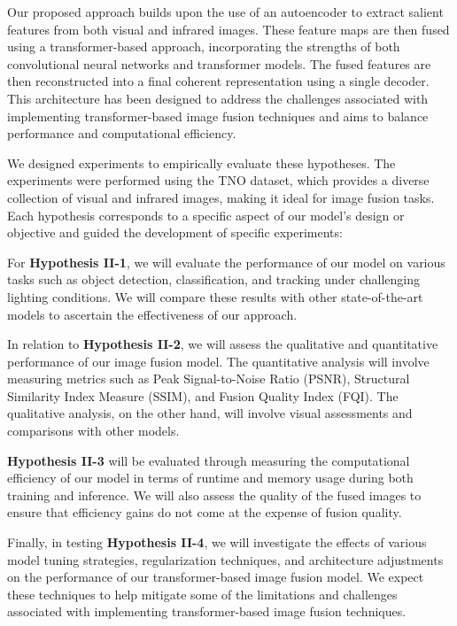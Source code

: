 Our proposed approach builds upon the use of an autoencoder to extract salient features from both visual and infrared images. These feature maps are then fused using a transformer-based approach, incorporating the strengths of both convolutional neural networks and transformer models. The fused features are then reconstructed into a final coherent representation using a single decoder. This architecture has been designed to address the challenges associated with implementing transformer-based image fusion techniques and aims to balance performance and computational efficiency.

We designed experiments to empirically evaluate these hypotheses. The experiments were performed using the TNO dataset, which provides a diverse collection of visual and infrared images, making it ideal for image fusion tasks. Each hypothesis corresponds to a specific aspect of our model's design or objective and guided the development of specific experiments:

For \textbf{Hypothesis II-1}, we will evaluate the performance of our model on various tasks such as object detection, classification, and tracking under challenging lighting conditions. We will compare these results with other state-of-the-art models to ascertain the effectiveness of our approach.

In relation to \textbf{Hypothesis II-2}, we will assess the qualitative and quantitative performance of our image fusion model. The quantitative analysis will involve measuring metrics such as Peak Signal-to-Noise Ratio (PSNR), Structural Similarity Index Measure (SSIM), and Fusion Quality Index (FQI). The qualitative analysis, on the other hand, will involve visual assessments and comparisons with other models.

\textbf{Hypothesis II-3} will be evaluated through measuring the computational efficiency of our model in terms of runtime and memory usage during both training and inference. We will also assess the quality of the fused images to ensure that efficiency gains do not come at the expense of fusion quality.

Finally, in testing \textbf{Hypothesis II-4}, we will investigate the effects of various model tuning strategies, regularization techniques, and architecture adjustments on the performance of our transformer-based image fusion model. We expect these techniques to help mitigate some of the limitations and challenges associated with implementing transformer-based image fusion techniques.

